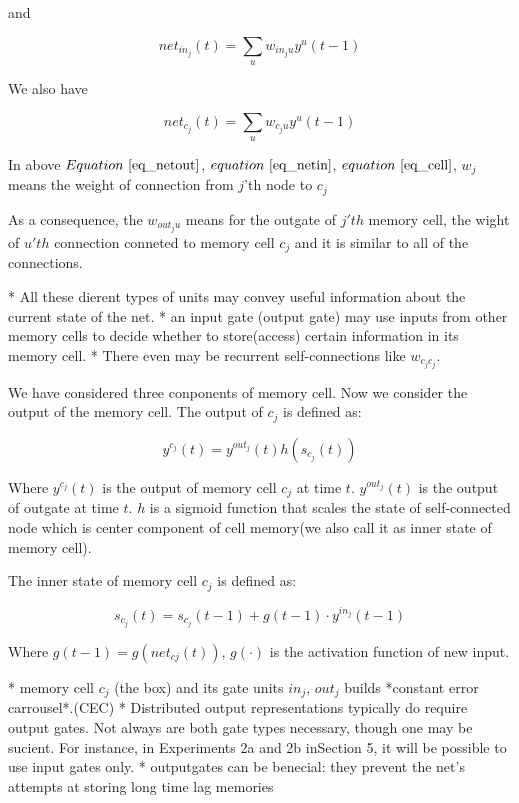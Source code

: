 \documentclass[officiallayout]{tktla}
\begin{document}
and


\begin{equation}
net_{in_j}(t) = \sum_u w_{in_ju}y^u(t-1) \label{eq_netin}
\end{equation}


We also have 


\begin{equation}
net_{c_j}(t) = \sum_u w_{c_ju}y^u(t-1) \label{eq_cell}
\end{equation}


In above $Equation~\ref{eq_netout}$, $equation~\ref{eq_netin}$, $equation~\ref{eq_cell}$, $w_{j}$ means the weight of connection from $j$'th node to $c_j$

As a consequence, the $w_{out_ju}$ means for the outgate of $j'th$ memory cell, the wight of $u'th$ connection conneted to memory cell $c_j$ and it is similar to all of the connections.

* All these dierent types of units may convey useful information about the current state of the net.
* an input gate (output gate) may use inputs from other memory cells to decide whether to store(access) certain information in its memory cell.
* There even may be recurrent self-connections like $w_{c_jc_j}$.

We have considered three conponents of memory cell. Now we consider the output of the memory cell.
The output of $c_j$ is defined as:


\begin{equation}
y^{c_j}(t) = y^{out_j}(t)h(s_{c_j}(t)) \label{eq_cell_out}
\end{equation}


Where $y^{c_j}(t)$ is the output of memory cell $c_j$ at time $t$. $y^{out_j}(t)$ is the output of outgate at time $t$. $h$ is a sigmoid function that scales the state of self-connected node which is center component of cell memory(we also call it as inner state of memory cell).

The inner state of memory cell $c_j$ is defined as:


\begin{equation}
s_{c_j}(t) = s_{c_j}(t-1) + g(t-1)\cdot y^{in_j}(t-1)
\end{equation}


Where $g(t-1) = g(net_{cj}(t))$, $g(\cdot)$ is the activation function of new input. 

* memory cell $c_j$ (the box) and its gate units $in_j$, $out_j$ builds *constant error carrousel*.(CEC)
* Distributed output representations typically do require output gates. Not always are both gate types necessary, though one may be sucient. For instance, in Experiments 2a and 2b inSection 5, it will be possible to use input gates only.
* outputgates can be benecial: they prevent the net's attempts at storing long time lag memories 
\end{document}
